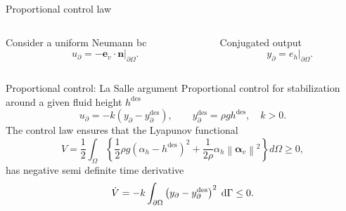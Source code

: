 \documentclass[aspectratio=169]{ISAE-Beamer}
\newcommand*{\norm}[1]{\ensuremath{\left\|#1\right\|}}
\begin{document}
\begin{frame}{Proportional control law}
\begin{columns}	
\begin{column}{.45\textwidth}
Consider a uniform Neumann bc
\begin{equation*}
	{u}_\partial = - \bm{e}_v \cdot \bm{n}\vert_{\partial\Omega}.
\end{equation*}
\end{column}
\begin{column}{.45\textwidth}
Conjugated output
\begin{equation*}
	{y}_\partial = {e}_h\vert_{\partial\Omega}.
\end{equation*}
\end{column}
\end{columns}
	
	
\begin{block}{Proportional control: La Salle argument}
Proportional control for stabilization around a given fluid height $h^{\text{des}}$
\begin{equation*}
	u_\partial = -k (y_\partial - y_\partial^{\text{des}}), \qquad y_\partial^{\text{des}}= \rho g h^{\text{des}}, \quad k>0.
\end{equation*}
The control law ensures that the Lyapunov functional
\begin{equation*}
	V = \frac{1}{2} \int_{\Omega}\left\{\frac{1}{2} \rho g (\alpha_h - h^{\text{des}})^2 + \frac{1}{2\rho} \alpha_h \norm{\bm{\alpha}_v}^2 \right\} d\Omega \ge 0,
\end{equation*}
has negative semi definite time derivative
\begin{equation*}
	\dot{V} = -k \int_{\partial \Omega}\left({y}_\partial - {y}_\partial^{\text{des}} \right)^2 \d{\Gamma} \le 0.
\end{equation*}
\end{block}

\end{frame}
\end{document}
